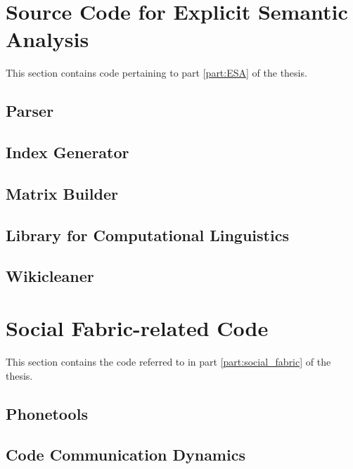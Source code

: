 \section{Source Code for Explicit Semantic Analysis}
This section contains code pertaining to part \ref{part:ESA} of the thesis.
\subsection{Parser}
\label{sec:xml_parse.py}
\newpage

\subsection{Index Generator}
\label{sec:generate_indices.py}
\newpage

\subsection{Matrix Builder}
\label{sec:matrix_builder.py}
\newpage

\subsection{Library for Computational Linguistics}
\label{sec:cunning_linguistics.py}

\subsection{Wikicleaner}
\label{sec:wikicleaner.py}
\newpage


\section{Social Fabric-related Code}
This section contains the code referred to in part \ref{part:social_fabric} of the thesis.

\subsection{Phonetools}
\label{sec:phonetools.py}
\newpage

\subsection{Code Communication Dynamics}
\label{sec:communication_dymanic_code}

